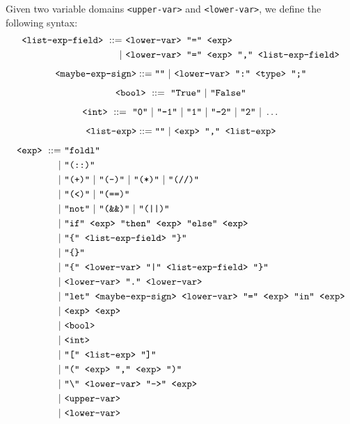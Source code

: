 \documentclass[]{scrbook}
\newcommand{\mf}[1]{\text{\texttt{#1}}}
\theoremstyle{definition}
\theoremstyle{definition}
\theoremstyle{definition}
\theoremstyle{remark}
\let\BeginKnitrBlock\begin \let\EndKnitrBlock\end
\begin{document}
\BeginKnitrBlock{definition}[Expression Syntax]
\protect\hypertarget{def:unnamed-chunk-25}{}{\label{def:unnamed-chunk-25}
{} }Given two variable domains
\texttt{\textless{}upper-var\textgreater{}} and
\texttt{\textless{}lower-var\textgreater{}}, we define the following
syntax: \[
\begin{aligned}
\mf{<list-exp-field>} \ ::=& \ \mf{<lower-var> "=" <exp>} \\
                          |& \ \mf{<lower-var> "=" <exp> "," <list-exp-field>}
\end{aligned}
\] \[
\mf{<maybe-exp-sign>} ::= \mf{""} \ | \ \mf{<lower-var> ":" <type> ";"}
\] \[
\mf{<bool>} \ ::= \ \mf{"True"} \ | \ \mf{"False"}
\] \[
\mf{<int>} \ ::= \ \mf{"0"} \ | \ \mf{"-1"} \ | \ \mf{"1"} \ | \ \mf{"-2"} \ | \ \mf{"2"} \ | \ \dots
\] \[
\mf{<list-exp>} ::= \mf{""} \ | \ \mf{<exp> "," <list-exp>}
\] \[
\begin{aligned}
\mf{<exp>} \ ::=& \ \mf{"foldl"}\\
               |& \ \mf{"(::)"}\\
               |& \ \mf{"(+)"} \ | \ \mf{"(-)"} \ | \ \mf{"(*)"} \ | \ \mf{"(//)"}\\
               |& \ \mf{"(<)"} \ | \ \mf{"(==)"}\\
               |& \ \mf{"not"} \ | \ \mf{"(\&\&)"} \ | \ \mf{"(||)"}\\
               |& \ \mf{"if" <exp> "then" <exp> "else" <exp>}\\
               |& \ \mf{"\{" <list-exp-field> "\}"}\\
               |& \ \mf{"\{\}"}\\
               |& \ \mf{"\{" <lower-var> "|" <list-exp-field> "\}"}\\
               |& \ \mf{<lower-var> "." <lower-var>}\\
               |& \ \mf{"let" <maybe-exp-sign> <lower-var> "=" <exp> "in" <exp>}\\
               |& \ \mf{<exp> <exp>}\\
               |& \ \mf{<bool>}\\
               |& \ \mf{<int>}\\
               |& \ \mf{"[" <list-exp> "]"}\\
               |& \ \mf{"(" <exp> "," <exp> ")"}\\
               |& \ \mf{"\textbackslash" <lower-var> "->" <exp>}\\
               |& \ \mf{<upper-var>}\\
               |& \ \mf{<lower-var>}
\end{aligned}
\]
\EndKnitrBlock{definition}
\end{document}
